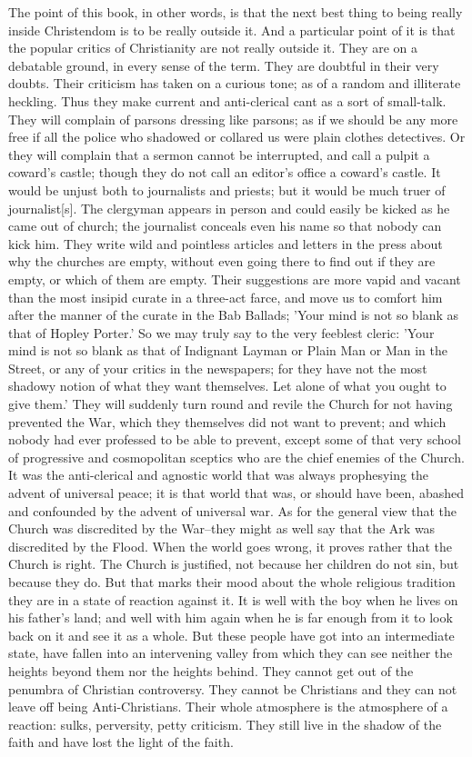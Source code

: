 The point of this book, in other words, is that the next best thing to being really inside Christendom is to be really outside it. And a particular point of it is that the popular critics of Christianity are not really outside it. They are on a debatable ground, in every sense of the term. They are doubtful in their very doubts. Their criticism has taken on a curious tone; as of a random and illiterate heckling. Thus they make current and anti-clerical cant as a sort of small-talk. They will complain of parsons dressing like parsons; as if we should be any more free if all the police who shadowed or collared us were plain clothes detectives. Or they will complain that a sermon cannot be interrupted, and call a pulpit a coward's castle; though they do not call an editor's office a coward's castle. It would be unjust both to journalists and priests; but it would be much truer of journalist[s]. The clergyman appears in person and could easily be kicked as he came out of church; the journalist conceals even his name so that nobody can kick him. They write wild and pointless articles and letters in the press about why the churches are empty, without even going there to find out if they are empty, or which of them are empty. Their suggestions are more vapid and vacant than the most insipid curate in a three-act farce, and move us to comfort him after the manner of the curate in the Bab Ballads; 'Your mind is not so blank as that of Hopley Porter.' So we may truly say to the very feeblest cleric: 'Your mind is not so blank as that of Indignant Layman or Plain Man or Man in the Street, or any of your critics in the newspapers; for they have not the most shadowy notion of what they want themselves. Let alone of what you ought to give them.' They will suddenly turn round and revile the Church for not having prevented the War, which they themselves did not want to prevent; and which nobody had ever professed to be able to prevent, except some of that very school of progressive and cosmopolitan sceptics who are the chief enemies of the Church. It was the anti-clerical and agnostic world that was always prophesying the advent of universal peace; it is that world that was, or should have been, abashed and confounded by the advent of universal war. As for the general view that the Church was discredited by the War--they might as well say that the Ark was discredited by the Flood. When the world goes wrong, it proves rather that the Church is right. The Church is justified, not because her children do not sin, but because they do. But that marks their mood about the whole religious tradition they are in a state of reaction against it. It is well with the boy when he lives on his father's land; and well with him again when he is far enough from it to look back on it and see it as a whole. But these people have got into an intermediate state, have fallen into an intervening valley from which they can see neither the heights beyond them nor the heights behind. They cannot get out of the penumbra of Christian controversy. They cannot be Christians and they can not leave off being Anti-Christians. Their whole atmosphere is the atmosphere of a reaction: sulks, perversity, petty criticism. They still live in the shadow of the faith and have lost the light of the faith.

